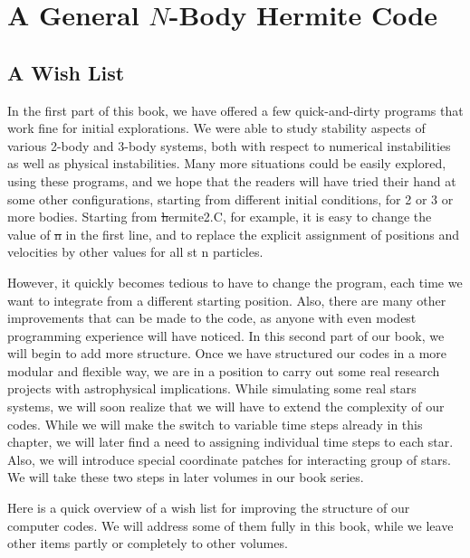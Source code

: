 \chapter{A General $N$-Body Hermite Code}

\section{A Wish List}

In the first part of this book, we have offered a few quick-and-dirty
programs that work fine for initial explorations.  We were able to
study stability aspects of various 2-body and 3-body systems, both
with respect to numerical instabilities as well as physical
instabilities.  Many more situations could be easily explored, using
these programs, and we hope that the readers will have tried their hand
at some other configurations, starting from different initial conditions,
for 2 or 3 or more bodies.  Starting from {\st hermite2.C}, for example,
it is easy to change the value of {\st n} in the first line, and to
replace the explicit assignment of positions and velocities by other
values for all {st n} particles.

However, it quickly becomes tedious to have to change the program,
each time we want to integrate from a different starting position.
Also, there are many other improvements that can be made to the code,
as anyone with even modest programming experience will have noticed.
In this second part of our book, we will begin to add more structure.
Once we have structured our codes in a more modular and flexible way,
we are in a position to carry out some real research projects with
astrophysical implications.  While simulating some real stars systems,
we will soon realize that we will have to extend the complexity of our
codes.  While we will make the switch to variable time steps already
in this chapter, we will later find a need to assigning individual time
steps to each star.  Also, we will introduce special coordinate
patches for interacting group of stars.  We will take these two steps
in later volumes in our book series.

Here is a quick overview of a wish list for improving the structure of
our computer codes.  We will address some of them fully in this book,
while we leave other items partly or completely to other volumes.

